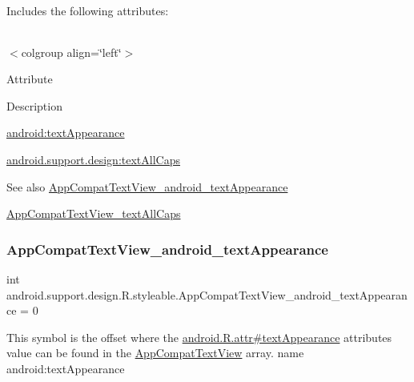 Includes the following attributes\+:

\tabulinesep=1mm
\begin{longtabu} spread 0pt [c]{*{0}{|X[-1]}|}
\hline
\end{longtabu}
$<$colgroup align=\char`\"{}left\char`\"{}$>$ 

Attribute

Description 

{\ttfamily \hyperlink{classandroid_1_1support_1_1design_1_1R_1_1styleable_a0725f046136b2f197dab6b21f51b82bf}{android\+:text\+Appearance}}

{\ttfamily \hyperlink{classandroid_1_1support_1_1design_1_1R_1_1styleable_ad008c51e469121e889f4880c5d72f62c}{android.\+support.\+design\+:text\+All\+Caps}}

\begin{DoxySeeAlso}{See also}
\hyperlink{classandroid_1_1support_1_1design_1_1R_1_1styleable_a0725f046136b2f197dab6b21f51b82bf}{App\+Compat\+Text\+View\+\_\+android\+\_\+text\+Appearance} 

\hyperlink{classandroid_1_1support_1_1design_1_1R_1_1styleable_ad008c51e469121e889f4880c5d72f62c}{App\+Compat\+Text\+View\+\_\+text\+All\+Caps} 
\end{DoxySeeAlso}
\mbox{\label{classandroid_1_1support_1_1design_1_1R_1_1styleable_a0725f046136b2f197dab6b21f51b82bf}} 
\subsubsection{\texorpdfstring{App\+Compat\+Text\+View\+\_\+android\+\_\+text\+Appearance}{AppCompatTextView\_android\_textAppearance}}
{\footnotesize\ttfamily int android.\+support.\+design.\+R.\+styleable.\+App\+Compat\+Text\+View\+\_\+android\+\_\+text\+Appearance = 0\hspace{0.3cm}{\ttfamily [static]}}

This symbol is the offset where the \hyperlink{}{android.\+R.\+attr\#text\+Appearance} attribute\textquotesingle{}s value can be found in the \hyperlink{classandroid_1_1support_1_1design_1_1R_1_1styleable_a4f8449fe92fa53cd1fd4547247fe52b6}{App\+Compat\+Text\+View} array.  name android\+:text\+Appearance \mbox{\label{classandroid_1_1support_1_1design_1_1R_1_1styleable_ad008c51e469121e889f4880c5d72f62c}} 

